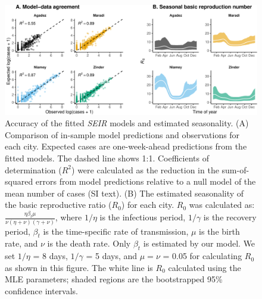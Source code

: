 \documentclass[3p]{elsarticle} %
\makeatletter
\def\maxwidth{\ifdim\Gin@nat@width>\linewidth\linewidth
\else\Gin@nat@width\fi}
\let\Oldincludegraphics\includegraphics
\renewcommand{\includegraphics}[1]{\Oldincludegraphics[width=\maxwidth]{#1}}
\makeatother
\begin{document}
\begin{figure}
\centering
\includegraphics{measles-ews-manuscript_files/figure-latex/scatters-r0-1.pdf}
\caption{Accuracy of the fitted \emph{SEIR} models and estimated
seasonality. (A) Comparison of in-sample model predictions and
observations for each city. Expected cases are one-week-ahead
predictions from the fitted models. The dashed line shows 1:1.
Coefficients of determination (\(R^2\)) were calculated as the reduction
in the sum-of-squared errors from model predictions relative to a null
model of the mean number of cases (SI text). (B) The estimated
seasonality of the basic reproductive ratio (\(R_0\)) for each city.
\(R_0\) was calculated as:
\(\frac{\eta \beta_t \mu}{\nu(\eta+\nu)(\gamma+\nu)}\), where \(1/\eta\)
is the infectious period, \(1/\gamma\) is the recovery period,
\(\beta_t\) is the time-specific rate of transmission, \(\mu\) is the
birth rate, and \(\nu\) is the death rate. Only \(\beta_t\) is estimated
by our model. We set \(1/\eta\) = 8 days, \(1/\gamma\) = 5 days, and
\(\mu = \nu\) = 0.05 for calculating \(R_0\) as shown in this figure.
The white line is \(R_0\) calculated using the MLE parameters; shaded
regions are the bootstrapped 95\% confidence intervals.
\label{scatters}}
\end{figure}
\end{document}
